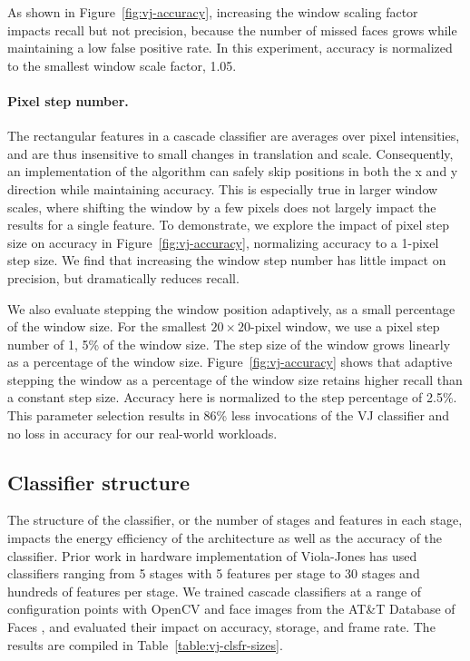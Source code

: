 As shown in Figure~\ref{fig:vj-accuracy}, increasing the window scaling factor impacts recall but not precision,
because the number of missed faces grows while maintaining a low false positive rate. In this experiment, accuracy is normalized to the smallest window scale factor, 1.05.

\paragraph{Pixel step number.}
The rectangular features in a cascade classifier are averages over pixel intensities,
and are thus insensitive to small changes in translation and scale. Consequently,
an implementation of the algorithm can safely skip positions in both the x and y direction while
maintaining accuracy. This is especially true in larger window scales, where shifting the window
by a few pixels does not largely impact the results for a single feature.
To demonstrate, we explore the impact of pixel step size on accuracy in Figure~\ref{fig:vj-accuracy}, normalizing
accuracy to a 1-pixel step size.  We find that increasing the window step number has little
impact on precision, but dramatically reduces recall.

We also evaluate stepping the window
position adaptively, as a small percentage of the window size. For the smallest $20\times 20$-pixel window, we use a
pixel step number of 1, 5\% of the window size. The step size of the window grows linearly as a
percentage of the window size. Figure~\ref{fig:vj-accuracy} shows that adaptive stepping the window as a percentage of the window size retains
higher recall than a constant step size. Accuracy here is normalized to the step percentage
of 2.5\%.
This parameter selection results in 86\% less invocations of the VJ classifier and no loss in accuracy for our real-world workloads.

\subsection{Classifier structure}
The structure of the classifier, or the number of stages and features in each stage,
impacts the energy efficiency of the architecture as well as the accuracy of the
classifier. Prior work in hardware implementation of Viola-Jones has used
classifiers ranging from 5 stages with 5 features per stage to 30 stages and
hundreds of features per stage. We trained cascade classifiers at a range of
configuration points with OpenCV and face images from
the AT\&T Database of Faces \cite{attfaces}, and evaluated their impact on accuracy, storage, and
frame rate. The results are compiled in Table~\ref{table:vj-clsfr-sizes}.

